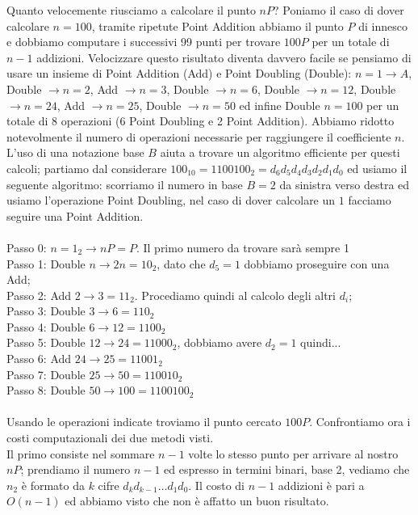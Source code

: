 \documentclass[a4paper,12pt]{tesiinfo}
\begin{document}
Quanto velocemente riusciamo a calcolare il punto $nP$? Poniamo il caso di dover calcolare $n=100$, tramite ripetute Point Addition abbiamo il punto $P$ di innesco e dobbiamo computare i successivi 99 punti per trovare $100P$ per un totale di $n-1$ addizioni. Velocizzare questo risultato diventa davvero facile se pensiamo di usare un insieme di Point Addition (Add) e Point Doubling (Double): $n=1 \to A$, Double $\to n=2$, Add $\to n=3$, Double $\to n=6$, Double $\to n=12$, Double $\to n=24$, Add $\to n=25$, Double $\to n=50$ ed infine Double $n=100$ per un totale di 8 operazioni (6 Point Doubling e 2 Point Addition). Abbiamo ridotto notevolmente il numero di operazioni necessarie per raggiungere il coefficiente $n$. 
\\
L'uso di una notazione base $B$ aiuta a trovare un algoritmo efficiente per questi calcoli; partiamo dal considerare $100_{10} = 1100100_2 = d_6d_5d_4d_3d_2d_1d_0$ ed usiamo il seguente algoritmo: scorriamo il numero in base $B=2$ da sinistra verso destra ed usiamo l'operazione Point Doubling, nel caso di dover calcolare un $1$ facciamo seguire una Point Addition. 
\\
\\
Passo 0: $n=1_2 \to nP = P$. Il primo numero da trovare sar\`a sempre 1\\
Passo 1: Double $n \to 2n = 10_2$, dato che $d_5 = 1$ dobbiamo proseguire con una Add;\\
Passo 2: Add    $2 \to 3 = 11_2$. Procediamo quindi al calcolo degli altri $d_i$;\\
Passo 3: Double $3 \to 6 = 110_2$\\
Passo 4: Double $6 \to 12 = 1100_2$\\
Passo 5: Double $12 \to 24 = 11000_2$, dobbiamo avere $d_2 = 1$ quindi...\\
Passo 6: Add    $24 \to 25 = 11001_2$\\
Passo 7: Double $25 \to 50 = 110010_2$\\
Passo 8: Double $50 \to 100 = 1100100_2$\\
\\
Usando le operazioni indicate troviamo il punto cercato $100P$. Confrontiamo ora i costi computazionali dei due metodi visti. 
\\
Il primo consiste nel sommare $n-1$ volte lo stesso punto per arrivare al nostro $nP$; prendiamo il numero $n-1$ ed espresso in termini binari, base 2, vediamo che $n_2$ \`e formato da $k$ cifre $d_kd_{k-1} \ldots d_1d_0$. Il costo di $n-1$ addizioni \`e pari a $O(n-1)$ ed abbiamo visto che non \`e affatto un buon risultato. 
\end{document}
